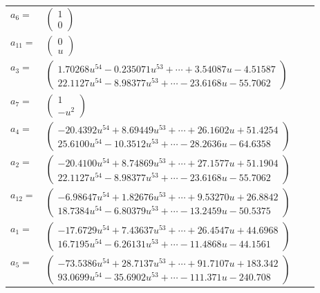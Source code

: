 \documentclass[1p]{elsarticle_modified}
\theoremstyle{definition}
\begin{document}
\begin{tabular}{m{7pt} m{180pt} m{7pt} m{180pt} }
\flushright $a_{6}=$&$\begin{pmatrix}1\\0\end{pmatrix}$ \\
\flushright $a_{11}=$&$\begin{pmatrix}0\\u\end{pmatrix}$ \\
\flushright $a_{3}=$&$\begin{pmatrix}1.70268 u^{54}-0.235071 u^{53}+\cdots+3.54087 u-4.51587\\22.1127 u^{54}-8.98377 u^{53}+\cdots-23.6168 u-55.7062\end{pmatrix}$ \\
\flushright $a_{7}=$&$\begin{pmatrix}1\\- u^2\end{pmatrix}$ \\
\flushright $a_{4}=$&$\begin{pmatrix}-20.4392 u^{54}+8.69449 u^{53}+\cdots+26.1602 u+51.4254\\25.6100 u^{54}-10.3512 u^{53}+\cdots-28.2636 u-64.6358\end{pmatrix}$ \\
\flushright $a_{2}=$&$\begin{pmatrix}-20.4100 u^{54}+8.74869 u^{53}+\cdots+27.1577 u+51.1904\\22.1127 u^{54}-8.98377 u^{53}+\cdots-23.6168 u-55.7062\end{pmatrix}$ \\
\flushright $a_{12}=$&$\begin{pmatrix}-6.98647 u^{54}+1.82676 u^{53}+\cdots+9.53270 u+26.8842\\18.7384 u^{54}-6.80379 u^{53}+\cdots-13.2459 u-50.5375\end{pmatrix}$ \\
\flushright $a_{1}=$&$\begin{pmatrix}-17.6729 u^{54}+7.43637 u^{53}+\cdots+26.4547 u+44.6968\\16.7195 u^{54}-6.26131 u^{53}+\cdots-11.4868 u-44.1561\end{pmatrix}$ \\
\flushright $a_{5}=$&$\begin{pmatrix}-73.5386 u^{54}+28.7137 u^{53}+\cdots+91.7107 u+183.342\\93.0699 u^{54}-35.6902 u^{53}+\cdots-111.371 u-240.708\end{pmatrix}$ \\

\end{tabular}
\end{document}
